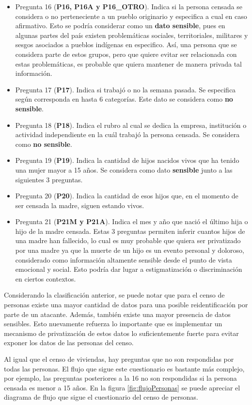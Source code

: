 \documentclass[informe]{upropuesta}
\begin{document}
\begin{itemize}
    \item Pregunta 16 (\textbf{P16, P16A y P16\_OTRO}). Indica si la persona censada se considera o no perteneciente a un pueblo originario y especifica a cual en caso afirmativo. Esto se podría considerar como un \textbf{dato sensible}, pues en algunas partes del país existen problemáticas sociales, territoriales, militares y sesgos asociados a pueblos indígenas en especifico. Así, una persona que se considera parte de estos grupos, pero que quiere evitar ser relacionada con estas problemáticas, es probable que quiera mantener de manera privada tal información.
    \item Pregunta 17 (\textbf{P17}). Indica si trabajó o no la semana pasada. Se especifica según corresponda en hasta 6 categorías. Este dato se considera como \textbf{no sensible}.
    \item Pregunta 18 (\textbf{P18}). Indica el rubro al cual se dedica la empresa, institución o actividad independiente en la cuál trabajó la persona censada. Se considera como \textbf{no sensible}.
    \item Pregunta 19 (\textbf{P19}). Indica la cantidad de hijos nacidos vivos que ha tenido una mujer mayor a 15 años. Se considera como dato \textbf{sensible} junto a las siguientes 3 preguntas.
    \item Pregunta 20 (\textbf{P20}). Indica la cantidad de esos hijos que, en el momento de ser censada la madre, siguen estando vivos.
    \item Pregunta 21 (\textbf{P21M y P21A}). Indica el mes y año que nació el último hija o hijo de la madre censada. Estas 3 preguntas permiten inferir cuantos hijos de una madre han fallecido, lo cual es muy probable que quiera ser privatizado por una madre ya que la muerte de un hijo es un evento personal y doloroso, considerado como información altamente sensible desde el punto de vista emocional y social. Esto podría dar lugar a estigmatización o discriminación en ciertos contextos.
\end{itemize}

Considerando la clasificación anterior, se puede notar que para el censo de personas existe una mayor cantidad de datos para una posible reidentificación por parte de un atacante. Además, también existe una mayor presencia de datos sensibles. Esto nuevamente refuerza lo importante que es implementar un mecanismo de privatización de estos datos lo suficientemente fuerte para evitar exponer los datos de las personas del censo. 

Al igual que el censo de viviendas, hay preguntas que no son respondidas por todas las personas. El flujo que sigue este cuestionario es bastante más complejo, por ejemplo, las preguntas posteriores a la 16 no son respondidas si la persona censada es menor a 15 años. En la figura \ref{fig:flujoPersonas} se puede apreciar el diagrama de flujo que sigue el cuestionario del censo de personas.
\end{document}
